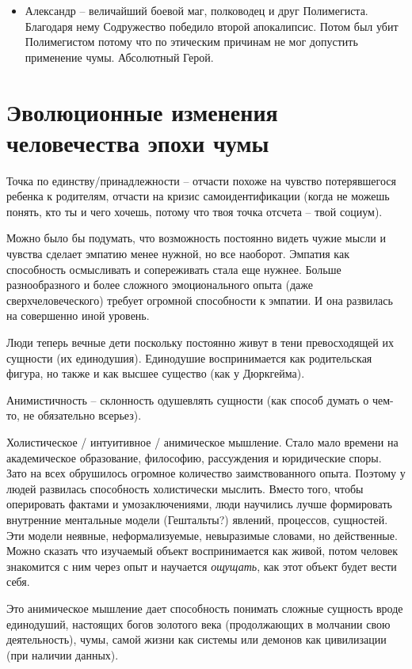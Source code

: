 \documentclass[12pt,a4paper]{article}
\begin{document}
\begin{itemize}
	\item Александр -- величайший боевой маг, полководец и друг Полимегиста. Благодаря нему Содружество победило второй апокалипсис. Потом был убит Полимегистом потому что по этическим причинам не мог допустить применение чумы. Абсолютный Герой.

\end{itemize}

\section*{Эволюционные изменения человечества эпохи чумы}

Точка по единству/принадлежности -- отчасти похоже на чувство потерявшегося ребенка к родителям, отчасти на кризис самоидентификации (когда не можешь понять, кто ты и чего хочешь, потому что твоя точка отсчета -- твой социум).

Можно было бы подумать, что возможность постоянно видеть чужие мысли и чувства сделает эмпатию менее нужной, но все наоборот. Эмпатия как способность осмысливать и сопереживать стала еще нужнее. Больше разнообразного и более сложного эмоционального опыта (даже сверхчеловеческого) требует огромной способности к эмпатии. И она развилась на совершенно иной уровень.

Люди теперь вечные дети поскольку постоянно живут в тени превосходящей их сущности (их единодушия). Единодушие воспринимается как родительская фигура, но также и как высшее существо (как у Дюркгейма).

Анимистичность -- склонность одушевлять сущности (как способ думать о чем-то, не обязательно всерьез).

Холистическое / интуитивное / анимическое мышление. Стало мало времени на академическое образование, философию, рассуждения и юридические споры. Зато на всех обрушилось огромное количество заимствованного опыта. Поэтому у людей развилась способность холистически мыслить. Вместо того, чтобы оперировать фактами и умозаключениями, люди научились лучше формировать внутренние ментальные модели (Гештальты?) явлений, процессов, сущностей. Эти модели неявные, неформализуемые, невыразимые словами, но действенные. Можно сказать что изучаемый объект воспринимается как живой, потом человек знакомится с ним через опыт и научается \textit{ощущать}, как этот объект будет вести себя.

Это анимическое мышление дает способность понимать сложные сущность вроде единодуший, настоящих богов золотого века (продолжающих в молчании свою деятельность), чумы, самой жизни как системы или демонов как цивилизации (при наличии данных).
\end{document}
